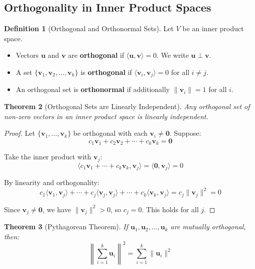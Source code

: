 \documentclass[12pt]{article}
\numberwithin{equation}{section}
\newcommand{\vect}[1]{\boldsymbol{#1}}   %
\theoremstyle{plain}
\newtheorem{theorem}{Theorem}[section]
\theoremstyle{definition}
\newtheorem{definition}[theorem]{Definition}
\theoremstyle{remark}
\begin{document}
\subsection{Orthogonality in Inner Product Spaces}

\begin{definition}[Orthogonal and Orthonormal Sets]
Let $V$ be an inner product space.
\begin{itemize}
\item Vectors $\vect{u}$ and $\vect{v}$ are \textbf{orthogonal} if $\langle \vect{u}, \vect{v} \rangle = 0$. We write $\vect{u} \perp \vect{v}$.
\item A set $\{\vect{v}_1, \vect{v}_2, \ldots, \vect{v}_k\}$ is \textbf{orthogonal} if $\langle \vect{v}_i, \vect{v}_j \rangle = 0$ for all $i \neq j$.
\item An orthogonal set is \textbf{orthonormal} if additionally $\|\vect{v}_i\| = 1$ for all $i$.
\end{itemize}
\end{definition}

\begin{theorem}[Orthogonal Sets are Linearly Independent]
Any orthogonal set of non-zero vectors in an inner product space is linearly independent.
\end{theorem}

\begin{proof}
Let $\{\vect{v}_1, \ldots, \vect{v}_k\}$ be orthogonal with each $\vect{v}_i \neq \vect{0}$. Suppose:
$$c_1\vect{v}_1 + c_2\vect{v}_2 + \cdots + c_k\vect{v}_k = \vect{0}$$

Take the inner product with $\vect{v}_j$:
$$\langle c_1\vect{v}_1 + \cdots + c_k\vect{v}_k, \vect{v}_j \rangle = \langle \vect{0}, \vect{v}_j \rangle = 0$$

By linearity and orthogonality:
$$c_1\langle \vect{v}_1, \vect{v}_j \rangle + \cdots + c_j\langle \vect{v}_j, \vect{v}_j \rangle + \cdots + c_k\langle \vect{v}_k, \vect{v}_j \rangle = c_j\|\vect{v}_j\|^2 = 0$$

Since $\vect{v}_j \neq \vect{0}$, we have $\|\vect{v}_j\|^2 > 0$, so $c_j = 0$. This holds for all $j$.
\end{proof}

\begin{theorem}[Pythagorean Theorem]
If $\vect{u}_1, \vect{u}_2, \ldots, \vect{u}_k$ are mutually orthogonal, then:
$$\left\|\sum_{i=1}^k \vect{u}_i\right\|^2 = \sum_{i=1}^k \|\vect{u}_i\|^2$$
\end{theorem}
\end{document}
